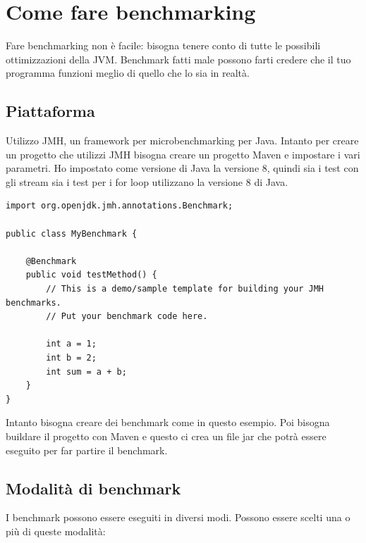 \documentclass[a4paper, 11pt,            %
openright,               %
italian,
english                 
]{article}       %
\begin{document}
	
	
	
	
	
	
	
	
	
	
	
	
	
	
	
	
	
	
	
	
	\section{Come fare benchmarking}
	Fare benchmarking non è facile: bisogna tenere conto di tutte le possibili ottimizzazioni della JVM. Benchmark fatti male possono farti credere che il tuo programma funzioni meglio di quello che lo sia in realtà.
	
	\subsection{Piattaforma}
	
	Utilizzo JMH, un framework per microbenchmarking per Java. Intanto per creare un progetto che utilizzi JMH bisogna creare un progetto Maven e impostare i vari parametri.
	Ho impostato come versione di Java la versione 8, quindi sia i test con gli stream sia i test per i for loop utilizzano la versione 8 di Java.
	
\begin{lstlisting}
import org.openjdk.jmh.annotations.Benchmark;

public class MyBenchmark {
	
	@Benchmark
	public void testMethod() {
		// This is a demo/sample template for building your JMH benchmarks. 
		// Put your benchmark code here.
		
		int a = 1;
		int b = 2;
		int sum = a + b;
	}
}
\end{lstlisting}

	Intanto bisogna creare dei benchmark come in questo esempio. Poi bisogna buildare il progetto con Maven e questo ci crea un file jar che potrà essere eseguito per far partire il benchmark.
	
	\subsection{Modalità di benchmark}
	
	I benchmark possono essere eseguiti in diversi modi. Possono essere scelti una o più di queste modalità:
	
\end{document}
